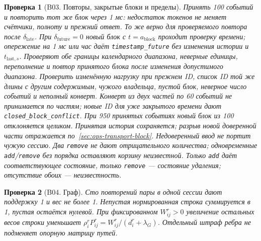 \documentclass[12pt,a4paper]{article}
\newcommand{\code}[1]{{\ttfamily\small\nolinkurl{#1}}}
\theoremstyle{plainru}
\newtheorem{testcase}{Проверка}[section]
\begin{document}
\begin{testcase}[B03. Повторы, закрытые блоки и пределы]
Принять 100 событий и повторить тот же блок через 1 мс:
недостаток токенов не меняет счётчики, полноту и прежний ответ.
То же верно для проверяемого повтора после $\delta_{\mathrm{late}}$.
При $\delta_{\mathrm{future}}=0$ новый блок с $t=a_{\mathrm{block}}$
проходит проверку времени; опережение на 1 мс или час даёт
\code{timestamp_future} без изменения истории и $t_{\mathrm{last},s}$.
Проверяют обе границы календарного диапазона, неверные единицы,
переполнение и повтор принятого блока после изменения допустимого диапазона.
Проверить изменённую нагрузку при прежнем ID, список ID той же длины
с другим содержимым, чужого владельца,
пустой блок, неверное число событий и неполный конверт.
Конверт из двух частей по 60 событий не принимается по частям;
новые ID для уже закрытого времени дают \code{closed_block_conflict}.
При 950 принятых событиях новый блок из 100 отклоняется целиком.
Принятая история сохраняется; разрыв новой доверенной части отражается
по~\ref{sec:ops-transport-block}. Недоверенный ввод не портит чужую сессию.
Два \code{remove} не дают отрицательного количества; одновременные
\code{add}/\code{remove} без порядка оставляют корзину неизвестной.
Только \code{add} даёт соответствующее состояние, только \code{remove}
--- состояние удаления; отсутствие обоих --- неизвестность.
\end{testcase}

\begin{testcase}[B04. Граф]
Сто повторений пары в одной сессии дают поддержку 1 и вес не более 1.
Непустая нормированная строка суммируется в 1, пустая остаётся нулевой.
При фиксированном $W_{ij}^r>0$ увеличение остальных весов строки
уменьшает $\rho_i^rP_{ij}^r=W_{ij}^r/(d_i^r+\lambda_G)$.
Отдельный штраф ребра не подменяет опорную матрицу путей.
\end{testcase}
\end{document}
